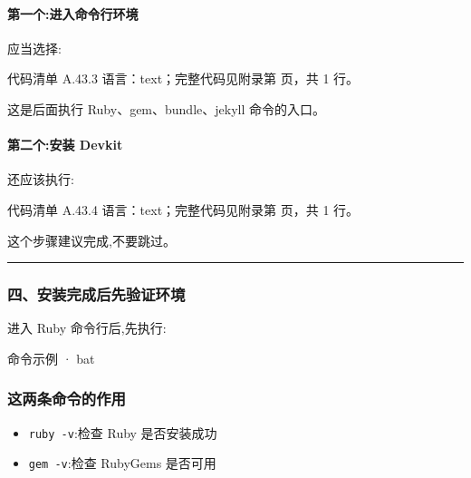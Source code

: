 \documentclass[lang=cn,scheme=chinese,color=blue,device=normal,toc=onecol,math=cm]{elegantbook}
\begin{document}
\paragraph{第一个:进入命令行环境}


应当选择:\par


\begin{codeindexbox}{代码清单 A.43.3}
语言：text；完整代码见附录第 \pageref{code:43:3} 页，共 1 行。
\end{codeindexbox}


这是后面执行 Ruby、gem、bundle、jekyll 命令的入口。\par


\paragraph{第二个:安装 Devkit}


还应该执行:\par


\begin{codeindexbox}{代码清单 A.43.4}
语言：text；完整代码见附录第 \pageref{code:43:4} 页，共 1 行。
\end{codeindexbox}


这个步骤建议完成,不要跳过。\par


\medskip\hrule\medskip


\subsubsection{四、安装完成后先验证环境}


进入 Ruby 命令行后,先执行:\par


\begin{inlinecodebox}{命令示例 · bat}
\end{inlinecodebox}


\subsubsection{这两条命令的作用}


\begin{itemize}
\item \texttt{ruby -v}:检查 Ruby 是否安装成功
\item \texttt{gem -v}:检查 RubyGems 是否可用
\end{itemize}
\end{document}
